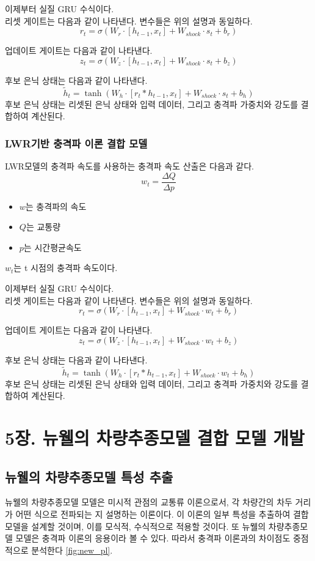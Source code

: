 \documentclass[11pt]{report}
\begin{document}
이제부터 실질 GRU 수식이다. \\
리셋 게이트는 다음과 같이 나타낸다. 변수들은 위의 설명과 동일하다. 
$$
r_t = \sigma(W_r \cdot [h_{t-1}, x_t] + W_{shock} \cdot s_t + b_r)
$$

업데이트 게이트는 다음과 같이 나타낸다. 
$$
z_t = \sigma(W_z \cdot [h_{t-1}, x_t] + W_{shock} \cdot s_t + b_z)
$$

후보 은닉 상태는 다음과 같이 나타낸다. 
$$
\tilde{h}_t = \tanh(W_h \cdot [r_t \ast h_{t-1}, x_t] + W_{shock} \cdot s_t + b_h)
$$
후보 은닉 상태는 리셋된 은닉 상태와 입력 데이터, 그리고 충격파 가중치와 강도를 결합하여 계산된다.

\subsection{LWR기반 충격파 이론 결합 모델}
LWR모델의 충격파 속도를 사용하는 충격파 속도 산출은 다음과 같다.
$$
w_t = \frac{\Delta Q}{\Delta p}
$$

\begin{itemize}
    \item $w$는 충격파의 속도
    \item $Q$는 교통량
    \item $p$는 시간평균속도
\end{itemize}

$w_t$는 t 시점의 충격파 속도이다.

이제부터 실질 GRU 수식이다. \\
리셋 게이트는 다음과 같이 나타낸다. 변수들은 위의 설명과 동일하다. 
$$
r_t = \sigma(W_r \cdot [h_{t-1}, x_t] + W_{shock} \cdot w_t + b_r)
$$

업데이트 게이트는 다음과 같이 나타낸다. 
$$
z_t = \sigma(W_z \cdot [h_{t-1}, x_t] + W_{shock} \cdot w_t + b_z)
$$

후보 은닉 상태는 다음과 같이 나타낸다. 
$$
\tilde{h}_t = \tanh(W_h \cdot [r_t \ast h_{t-1}, x_t] + W_{shock} \cdot w_t + b_h)
$$
후보 은닉 상태는 리셋된 은닉 상태와 입력 데이터, 그리고 충격파 가중치와 강도를 결합하여 계산된다.

\chapter*{5장. 뉴웰의 차량추종모델 결합 모델 개발}
\setcounter{chapter}{5}
\setcounter{section}{0}
\setcounter{subsection}{0}

\section{뉴웰의 차량추종모델 특성 추출}
뉴웰의 차량추종모델 모델은 미시적 관점의 교통류 이론으로서, 각 차량간의 차두 거리가 어떤 식으로 전파되는 지 설명하는 이론이다. 
이 이론의 일부 특성을 추출하여 결합 모델을 설계할 것이며, 이를 모식적, 수식적으로 적용할 것이다. 
또 뉴웰의 차량추종모델 모델은 충격파 이론의 응용이라 볼 수 있다. 
따라서 충격파 이론과의 차이점도 중점적으로 분석한다 \autoref{fig:new_pl}. 
\end{document}
